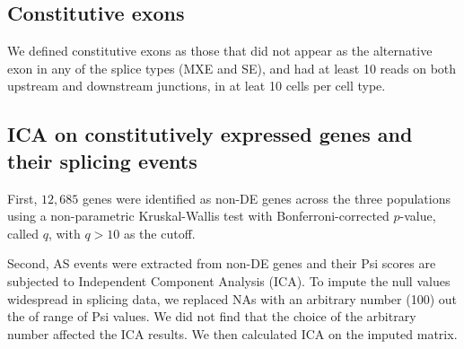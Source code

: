 
\subsection{Constitutive exons}

We defined constitutive exons as those that did not appear as the alternative exon in any of the splice types (MXE and SE), and had at least 10 reads on both upstream and downstream junctions, in at leat 10 cells per cell type.

\subsection{ICA on constitutively expressed genes and their splicing events}
First, $12,685$ genes were identified as non-DE genes across the three populations using a non-parametric Kruskal-Wallis test with Bonferroni-corrected $p$-value, called $q$, with $q > 10$ as the cutoff. 

Second, AS events were extracted from non-DE genes and their Psi scores are subjected to Independent Component Analysis (ICA). To impute the null values widespread in splicing data, we replaced NAs with an arbitrary number (100) out the of range of Psi values. We did not find that the choice of the arbitrary number affected the ICA results. We then calculated ICA on the imputed matrix.

